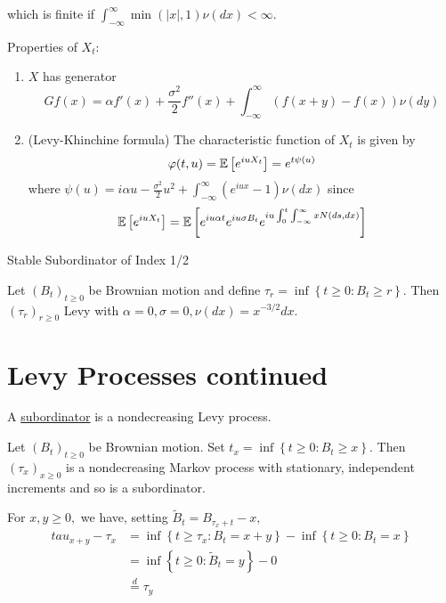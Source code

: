 \documentclass[../../../Master/AppliedStochastics.tex]{subfiles}
\begin{document}
which is finite if $\int _{-\infty}^{\infty} \min( |x|, 1 ) \nu(dx) < \infty.$

Properties of $X_t:$

\begin{enumerate}
	\item $X$ has generator
	\begin{equation}
	Gf(x)=\alpha f'(x) + \frac{\sigma^2}{2} f''(x) + \int_{-\infty}^{\infty} 
	\left( f(x+y) - f(x) \right) \nu(dy)
	\end{equation}
	
	\item (Levy-Khinchine formula)
	The characteristic function of $X_t$ is given by
	\begin{equation}
	\varphi(t, u)
	= \mathbb{E} \left[ e^{i u X_t} \right]
	= e^{t\psi(u)}
	\end{equation}
	where $\psi(u)=i \alpha u - \frac{\sigma^2}{2} u^2 + 
	\int_{-\infty}^{\infty} \left( e^{i u x} - 1 \right) \nu(dx)$
	since
	\begin{equation}
	\mathbb{E} \left[ e^{i u X_t} \right] 
	= \mathbb{E} \left[ e^{i u \alpha t} e^{i u \sigma B_t} e^{i u \int_{0}^{t} 
	\int_{-\infty}^{\infty} x N(ds, dx) } \right]
	\end{equation}
\end{enumerate}

\begin{example}Stable Subordinator of Index 1/2

Let $(B_t)_{t \geq 0}$ be Brownian motion and define
$\tau_r = \inf \left\lbrace t \geq 0 : B_t \geq r \right\rbrace.$
Then $(\tau_r)_{r \geq 0 }$ Levy with
$
\alpha=0,
\sigma=0,
\nu(dx)=x^{-3/2}dx.
$
\end{example}

\section{Levy Processes continued}

\begin{definition}
	A \underline{subordinator} is a nondecreasing Levy process.
\end{definition}

Let $(B_t)_{t \geq 0}$ be Brownian motion.
Set $t_x = \inf \left\lbrace t \geq 0 : B_t \geq x \right\rbrace.$ 
Then $(\tau_x)_{x \geq 0}$ is a nondecreasing Markov process with stationary, 
independent increments
and so is a subordinator.

For $x,y \geq 0,$ we have, setting $\tilde{B}_t = B_{\tau_x + t} - x,$
$$
\begin{aligned}
tau_{x + y} - \tau_x 
& = \inf \left\lbrace t \geq \tau_x : B_t = x + y \right\rbrace 
- \inf \left\lbrace t \geq 0 : B_t = x \right\rbrace \\
& = \inf \left\lbrace t \geq 0 : \tilde{B}_t = y \right\rbrace
- 0 \\
& \stackrel{d}{=} \tau_y
\end{aligned}
$$
\end{document}
